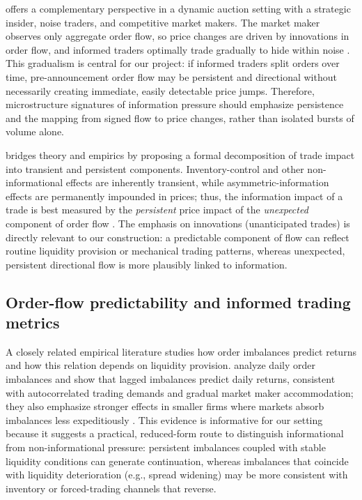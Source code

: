\citet{Kyle1985} offers a complementary perspective in a dynamic auction setting with a strategic insider,
noise traders, and competitive market makers. The market maker observes only aggregate order flow, so
price changes are driven by innovations in order flow, and informed traders optimally trade gradually to
hide within noise \citep{Kyle1985}. This gradualism is central for our project: if informed traders split
orders over time, pre-announcement order flow may be persistent and directional without necessarily
creating immediate, easily detectable price jumps. Therefore, microstructure signatures of information
pressure should emphasize persistence and the mapping from signed flow to price changes, rather than
isolated bursts of volume alone.

\citet{Hasbrouck1991} bridges theory and empirics by proposing a formal decomposition of trade impact into
transient and persistent components. Inventory-control and other non-informational effects are inherently
transient, while asymmetric-information effects are permanently impounded in prices; thus, the information
impact of a trade is best measured by the \emph{persistent} price impact of the \emph{unexpected} component
of order flow \citep{Hasbrouck1991}. The emphasis on innovations (unanticipated trades) is directly relevant
to our construction: a predictable component of flow can reflect routine liquidity provision or mechanical
trading patterns, whereas unexpected, persistent directional flow is more plausibly linked to information.

\subsection{Order-flow predictability and informed trading metrics}
A closely related empirical literature studies how order imbalances predict returns and how this relation
depends on liquidity provision. \citet{ChordiaSubrahmanyam2004} analyze daily order imbalances and show that
lagged imbalances predict daily returns, consistent with autocorrelated trading demands and gradual market
maker accommodation; they also emphasize stronger effects in smaller firms where markets absorb imbalances
less expeditiously \citep{ChordiaSubrahmanyam2004}. This evidence is informative for our setting because it
suggests a practical, reduced-form route to distinguish informational from non-informational pressure:
persistent imbalances coupled with stable liquidity conditions can generate continuation, whereas imbalances
that coincide with liquidity deterioration (e.g., spread widening) may be more consistent with inventory or
forced-trading channels that reverse.

